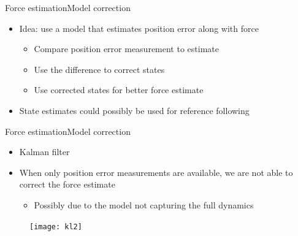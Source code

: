 

\begin{frame}{Force estimation}{Model correction}
\begin{itemize}
\item Idea: use a model that estimates position error along with force
\begin{itemize}
\item Compare position error measurement to estimate
\item Use the difference to correct states 
\item Use corrected states for better force estimate
\end{itemize}
\item State estimates could possibly be used for reference following
\end{itemize}


\end{frame}

\begin{frame}{Force estimation}{Model correction}
\begin{itemize}
\item Kalman filter 
\item When only position error measurements are available, we are not able to correct the force estimate
\begin{itemize}
\item Possibly due to the model not capturing the full dynamics
\end{itemize}
\end{itemize}
\begin{figure}
\centering
\texttt{[image: kl2]}
\end{figure}
\end{frame}



